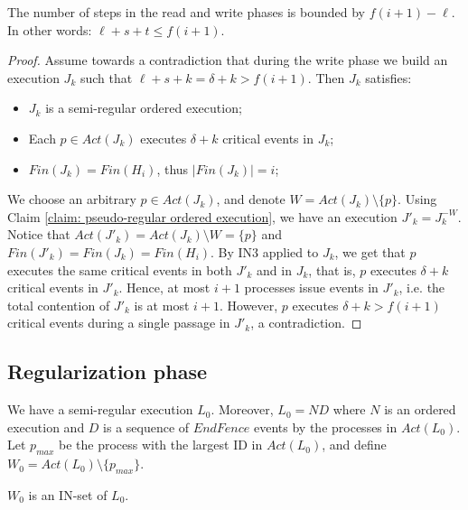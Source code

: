 \begin{claim-section} \label{claim: write-upper-bound}
	The number of steps in the read and write phases is bounded by $f(i+1)-\ell$. In other words: $\ell+s+t \leq f(i+1)$.
\end{claim-section}

\begin{proof}
	Assume towards a contradiction that during the write phase we build an execution $J_k$ such that $\ell+s+k = \delta+k > f(i+1)$. Then $J_k$ satisfies:
	\begin{itemize}
		\item $J_k$ is a semi-regular ordered execution;
		\item Each $p \in Act(J_k)$ executes $\delta+k$ critical events in $J_k$;
		\item $Fin(J_k) = Fin(H_i)$, thus $|Fin(J_k)| = i$;
	\end{itemize}
	We choose an arbitrary $p \in Act(J_k)$, and denote $W = Act(J_k) \setminus \{p\}$. Using Claim \ref{claim: pseudo-regular ordered execution}, we have an execution $J'_k = J_k^{-W}$. Notice that $Act(J'_k) = Act(J_k) \setminus W = \{p\}$ and $Fin(J'_k) = Fin(J_k) = Fin(H_i)$. By IN3 applied to $J_k$, we get that $p$ executes the same critical events in both $J'_k$ and in $J_k$, that is, $p$ executes $\delta+k$ critical events in $J'_k$.
Hence, at most $i+1$ processes issue events in $J'_k$, i.e. the total contention of $J'_k$ is at most $i+1$. However, $p$ executes $\delta+k > f(i+1)$ critical events during a single passage in $J'_k$, a contradiction.
\end{proof}



\newpage
\subsection{Regularization phase}
We have a semi-regular execution $L_0$. Moreover, $L_0 = N D$ where $N$ is an ordered execution and $D$ is a sequence of $EndFence$ events by the processes in $Act(L_0)$. Let $p_{max}$ be the process with the largest ID in $Act(L_0)$, and define $W_0 = Act(L_0) \setminus \{p_{max}\}$.

\begin{claim-subsection} \label{claim: W_0-is-an-IN-set}
	$W_0$ is an IN-set of $L_0$.
\end{claim-subsection}

